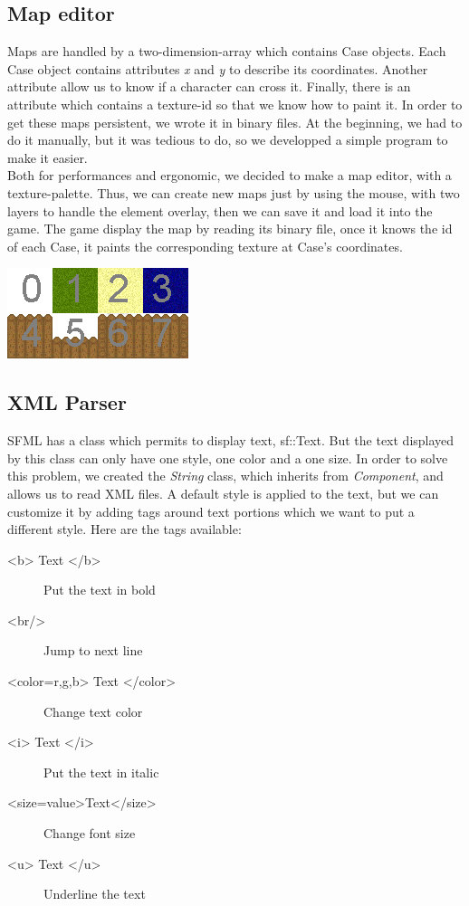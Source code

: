 \documentclass{scrreprt}
\begin{document}
		  \subsection{Map editor}
		Maps are handled by a two-dimension-array which contains Case objects. Each Case object contains attributes \emph{x} and \emph{y} to describe its coordinates. Another attribute allow us to know if a character can cross it. Finally, there is an attribute which contains a texture-id so that we know how to paint it. In order to get these maps persistent, we wrote it in binary files. At the beginning, we had to do it manually, but it was tedious to do, so we developped a simple program to make it easier.\\

		Both for performances and ergonomic, we decided to make a map editor, with a texture-palette. Thus, we can create new maps just by using the mouse, with two layers to handle the element overlay, then we can save it and load it into the game. The game display the map by reading its binary file, once it knows the id of each Case, it paints the corresponding texture at Case's coordinates.

		\begin{center}
		\includegraphics{image1.png}
		\end{center}
		
		\subsection{XML Parser}
		SFML has a class which permits to display text, sf::Text. But the text displayed by this class can only have one style, one color and a one size. In order to solve this problem, we created the \emph{String} class, which inherits from \emph{Component}, and allows us to read XML files. A default style is applied to the text, but we can customize it by adding tags around text portions which we want to put a different style. Here are the tags available:
		\begin{description}
		\item[<b> Text </b>]{Put the text in bold}
		\item[<br/>]{Jump to next line}
		\item[<color=r,g,b> Text </color>]{Change text color}
		\item[<i> Text </i>]{Put the text in italic}
		\item[<size=value>Text</size>]{Change font size}
		\item[<u> Text </u>]{Underline the text}
		\end{description}
\end{document}
